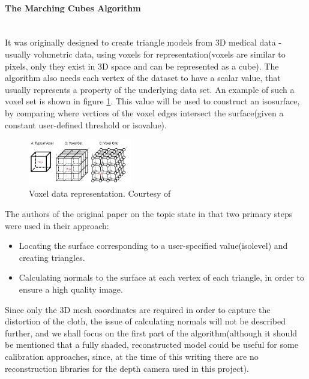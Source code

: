 \documentclass[]{article}
\begin{document}
\paragraph{The Marching Cubes Algorithm}\mbox{}\\

It was originally designed to create triangle models  from 3D medical data - usually volumetric data, using voxels for representation(voxels are similar to pixels, only they exist in 3D space and can be represented as a cube). The algorithm also needs each vertex of the dataset to have a scalar value, that usually represents a property of the underlying data set. An example of such a voxel set is shown in figure \ref{fig:VoxelSet}. This value will be used to construct an isosurface, by comparing where vertices of the voxel edges intersect the surface(given a constant user-defined threshold or isovalue).

\begin{figure}[hbtp]
    \centering
    \includegraphics[width=0.4\textwidth]{figures/Voxels.PNG}
    \caption{Voxel data representation. Courtesy of \cite{navpreet2013}}
    \label{fig:VoxelSet}
\end{figure}


 The authors of the original paper on the topic state in \cite{william87} that two primary steps were used in their approach:
\begin{itemize}
\item Locating the surface corresponding to a user-specified value(isolevel) and creating triangles.
\item Calculating normals to the surface at each vertex of each triangle, in order to ensure a high quality image.
\end{itemize}

Since only the 3D mesh coordinates are required in order to capture the distortion of the cloth, the issue of calculating normals will not be described further, and we shall focus on the first part of the algorithm(although it should be mentioned that a fully shaded, reconstructed model could be useful for some calibration approaches, since, at the time of this writing there are no reconstruction libraries for the depth camera used in this project).
\end{document}
